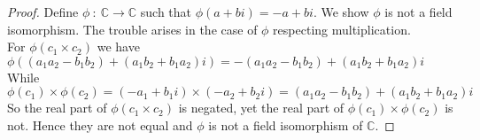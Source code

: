 \documentclass[11pt]{article}
\begin{document}
\begin{proof}
	Define $\phi\ :\ \mathbb{C} \rightarrow \mathbb{C}$
	such that $\phi(a + bi) = -a + bi$. We show $\phi$ is not a field isomorphism. 
	The trouble arises in the case of $\phi$ respecting multiplication.  \\
	For $\phi(c_1 \times c_2)$ we have $\phi((a_1a_2 - b_1b_2) + (a_1b_2 + b_1a_2)i) = -(a_1a_2 - b_1b_2) + (a_1b_2 + b_1a_2)i$ \\
	While $\phi(c_1) \times \phi(c_2) = (-a_1 + b_1i) \times (-a_2 + b_2i) = (a_1a_2 - b_1b_2) + (a_1b_2 + b_1a_2)i$
	So the real part of $\phi(c_1 \times c_2)$ is negated, yet the real part of $\phi(c_1) \times \phi(c_2)$ is not.
	Hence they are not equal and $\phi$ is not a field isomorphism of $\mathbb{C}$.
%
%
%

\end{proof}
\end{document}
